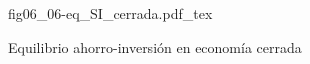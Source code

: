 \begin{figure}[h]
\centering
\def\svgwidth{0.5\textwidth}
{fig06_06-eq_SI_cerrada.pdf_tex}
\caption{Equilibrio ahorro-inversión en economía cerrada}
\label{fig06_06-eq_SI_cerrada}
\end{figure}